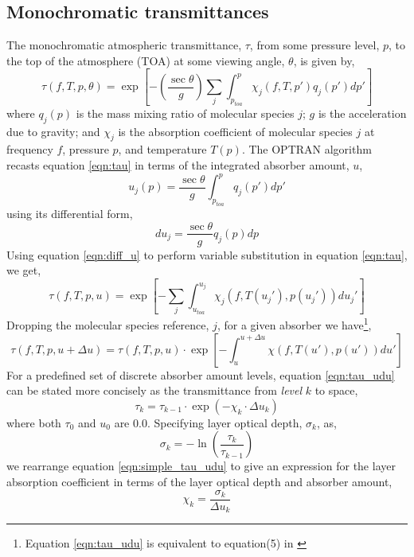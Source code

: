 \subsection{Monochromatic transmittances}
The monochromatic atmospheric transmittance, $\tau$, from some pressure level, $p$, to the top of the atmosphere (TOA) at some viewing angle, $\theta$, is given by,
\begin{equation}
  \tau(f,T,p,\theta) = \exp\left[-\left(\frac{\sec\theta}{g}\right)\sum_{j}\int_{p_{toa}}^{p}\chi_{j}(f,T,p') q_{j}(p')dp'\right]
  \label{eqn:tau}
\end{equation}
where $q_{j}(p)$ is the mass mixing ratio of molecular species $j$; $g$ is the acceleration due to gravity; and $\chi_{j}$ is the absorption coefficient of molecular species $j$ at frequency $f$, pressure $p$, and temperature $T(p)$. The OPTRAN algorithm\cite{OPTRAN3} recasts equation \ref{eqn:tau} in terms of the integrated absorber amount, $u$,
\begin{equation}
  u_{j}(p) = \frac{\sec\theta}{g}\int_{p_{toa}}^{p}q_{j}(p')dp'
  \label{eqn:int_u}
\end{equation}
using its differential form,
\begin{equation}
  du_{j} = \frac{\sec\theta}{g}q_{j}(p)dp
  \label{eqn:diff_u}
\end{equation}
Using equation \ref{eqn:diff_u} to perform variable substitution in equation \ref{eqn:tau}, we get,
\begin{equation}
  \tau(f,T,p,u) = \exp\left[-\sum_{j}\int_{u_{toa}}^{u_{j}}\chi_{j}(f,T(u_{j}'),p(u_{j}'))du_{j}'\right]
  \label{eqn:tau_u}
\end{equation}
Dropping the molecular species reference, $j$, for a given absorber we have\footnote{Equation \ref{eqn:tau_udu} is equivalent to equation(5) in \cite{OPTRAN3}},
\begin{equation}
  \tau(f,T,p,u+\Delta{u}) = \tau(f,T,p,u)\cdot\exp\left[-\int_{u}^{u+\Delta{u}}\chi(f,T(u'),p(u'))du'\right]
  \label{eqn:tau_udu}
\end{equation}
For a predefined set of discrete absorber amount levels, equation \ref{eqn:tau_udu} can be stated more concisely as the transmittance from \emph{level} $k$ to space,
\begin{equation}
  \tau_{k} = \tau_{k-1}\cdot\exp(-\chi_{k}\cdot\Delta{u}_{k})
  \label{eqn:simple_tau_udu}
\end{equation}
where both $\tau_{0}$ and $u_{0}$ are 0.0. Specifying layer optical depth, $\sigma_{k}$, as,
\begin{equation}
  \sigma_{k} = -\ln\left(\frac{\tau_{k}}{\tau_{k-1}}\right)
  \label{eqn:layer_od}
\end{equation}
we rearrange equation \ref{eqn:simple_tau_udu} to give an expression for the layer absorption coefficient in terms of the layer optical depth and absorber amount,
\begin{equation}
  \chi_{k} = \frac{\sigma_{k}}{\Delta{u}_{k}}
  \label{eqn:layer_chi}
\end{equation}


